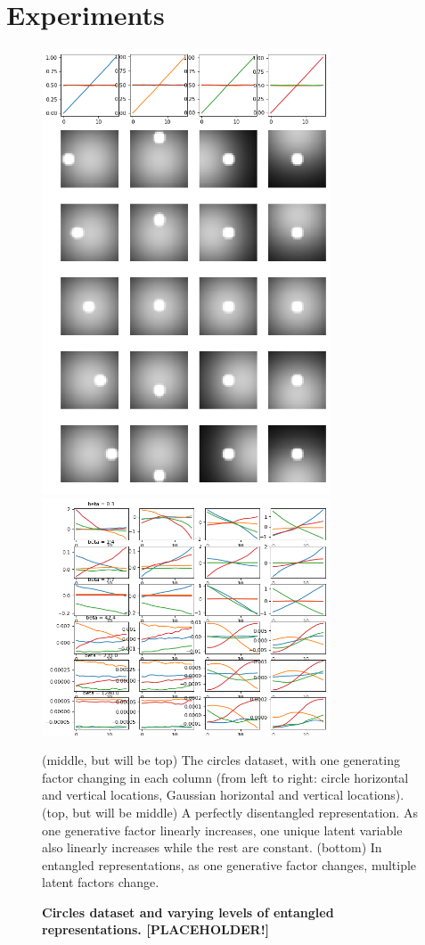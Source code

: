 \documentclass[10pt,letterpaper]{article}
\begin{document}
\section{Experiments}

\begin{figure}%
     \includegraphics[width=3.375in]{entangle_analysis_supervised_anddata.png}
     \includegraphics[width=3.375in]{entangle_analysis_betaVAE.png}
  \caption{\textbf{Circles dataset and varying levels of entangled representations. [PLACEHOLDER!]}}{(middle, but will be top) The circles dataset, with one generating factor changing in each column (from left to right: circle horizontal and vertical locations, Gaussian horizontal and vertical locations). (top, but will be middle) A perfectly disentangled representation. As one generative factor linearly increases, one unique latent variable also linearly increases while the rest are constant. (bottom) In entangled representations, as one generative factor changes, multiple latent factors change.}
  \label{fig:dataset}
\end{figure}
\end{document}
